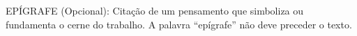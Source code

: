 
\begin{epigrafe}

\OnehalfSpacing
EPÍGRAFE (Opcional): Citação de um pensamento que simboliza ou fundamenta o cerne do trabalho. A palavra “epígrafe” não deve preceder o texto.

\end{epigrafe}
